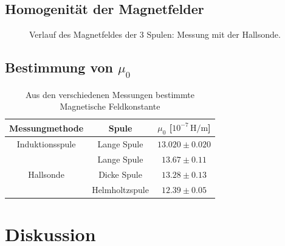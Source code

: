 \documentclass[12pt,a4paper,titlepage,headinclude,bibtotoc]{scrartcl}
\begin{document}
\subsection{Homogenität der Magnetfelder}
\begin{figure}[!htb]
	\centering
	
	\caption{Verlauf des Magnetfeldes der 3 Spulen: Messung mit der Hallsonde.}
	\label{fig:Homogen}
\end{figure}

\subsection{Bestimmung von $\mu_0$}
\begin{table}[!htb]
	\centering
	\begin{tabular}{|c|c|c|}
	\hline
	Messungmethode & Spule & $\mu_0$ [$10^{-7}\,\si{\henry\per\meter}$]\\
	\hline
	\hline
	Induktionsspule & Lange Spule & $13.020 \pm 0.020$\\
	\hline
	          & Lange Spule & $13.67 \pm 0.11$ \\
	Hallsonde & Dicke Spule & $13.28 \pm 0.13$ \\
	          & Helmholtzspule & $12.39 \pm 0.05$ \\
	\hline	
	\end{tabular}
	\caption{Aus den verschiedenen Messungen bestimmte Magnetische Feldkonstante}
\end{table}


\section{Diskussion}
\label{sec:diskussion}



\end{document}
